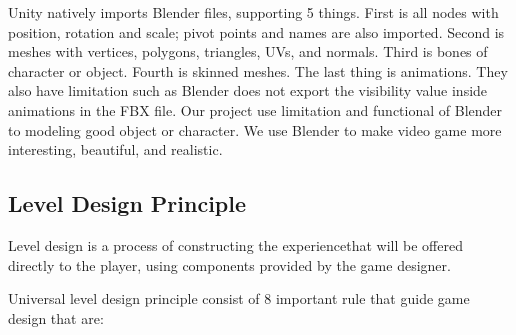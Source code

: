\documentclass[journal]{IEEEtran}										    %
\begin{document}
                Unity natively imports Blender files, supporting 5 things. 
                First is all nodes with position, rotation and scale; pivot 
                points and names are also imported. Second is meshes with vertices, 
                polygons, triangles, UVs, and normals. Third is bones of character 
                or object. Fourth is skinned meshes. The last thing is animations. 
                They also have limitation such as Blender does not export the 
                visibility value inside animations in the FBX file. Our project 
                use limitation and functional of Blender to modeling good object 
                or character. We use Blender to make video game more interesting, 
                beautiful, and realistic.

            \subsection{Level Design Principle}
                Level design is a process of constructing the experiencethat will 
                be offered directly to the player, using components provided by 
                the game designer.

                Universal level design principle consist of 8 important rule that 
                guide game design that are:
\end{document}
